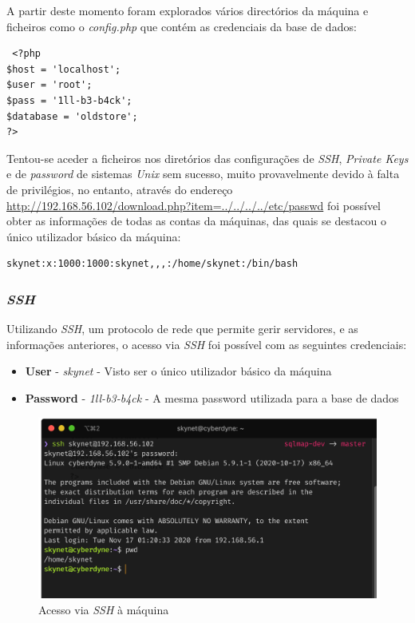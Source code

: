 \documentclass[10pt,english]{article}
\begin{document}
\par A partir deste momento foram explorados vários directórios da máquina e ficheiros como o \textit{config.php} que contém as credenciais da base de dados:

\begin{lstlisting}
 <?php
$host = 'localhost';
$user = 'root';
$pass = '1ll-b3-b4ck';
$database = 'oldstore';
?>
\end{lstlisting}

\par Tentou-se aceder a ficheiros nos diretórios das configurações de \textit{SSH}, \textit{Private Keys} e de \textit{password} de sistemas \textit{Unix} sem sucesso, muito provavelmente devido à falta de privilégios, no entanto, através do endereço \url{http://192.168.56.102/download.php?item=../../../../etc/passwd} foi possível obter as informações de todas as contas da máquinas, das quais se destacou o único utilizador básico da máquina:

\begin{lstlisting}
skynet:x:1000:1000:skynet,,,:/home/skynet:/bin/bash
\end{lstlisting}

\subsubsection{\textit{SSH}}

\par Utilizando \textit{SSH}, um protocolo de rede que permite gerir servidores, e as informações anteriores, o acesso via \textit{SSH} foi possível com as seguintes credenciais:

\begin{itemize}
    \item \textbf{User} - \textit{skynet} - Visto ser o único utilizador básico da máquina
    \item \textbf{Password} - \textit{1ll-b3-b4ck} - A mesma password utilizada para a base de dados
\end{itemize}

\begin{figure}[!h]
        \centering
        \includegraphics[width=\textwidth]{images/ssh.png}
        \caption{Acesso via \textit{SSH} à máquina}
\end{figure}
\end{document}
